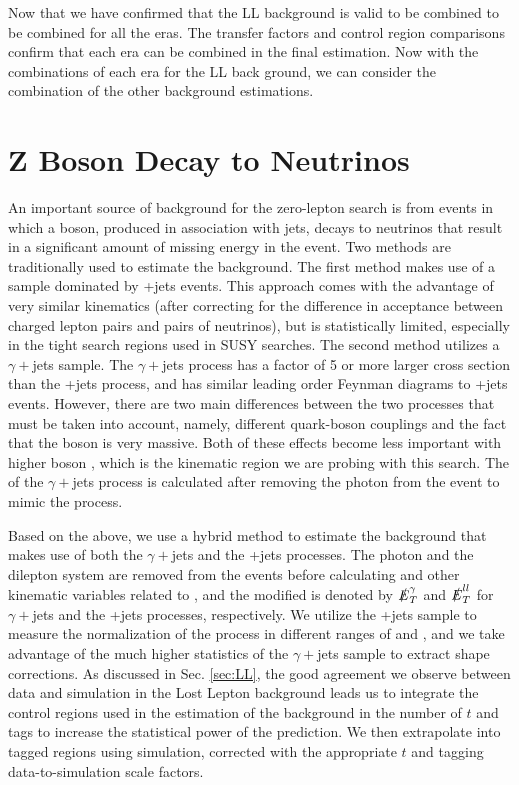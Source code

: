 Now that we have confirmed that the LL background is valid to be combined to be combined for all the eras. The transfer factors and control region comparisons confirm that each era can be combined in the final estimation. Now with the combinations of each era for the LL back ground, we can consider the combination of the other background estimations. 

\section{Z Boson Decay to Neutrinos}
\label{subsec:Znunu}

An important source of background for the zero-lepton search is from events in which a \Z{} boson, produced in association with jets, decays to neutrinos that result in a significant amount of missing energy in the event. Two methods are traditionally used to estimate the \Znunu{} background. The first method makes use of a sample dominated by \Zll+jets events. This approach comes with the advantage of very similar kinematics (after correcting for the difference in acceptance between charged lepton pairs and pairs of neutrinos), but is statistically limited, especially in the tight search regions used in SUSY searches. The second method utilizes a $\gamma+$jets sample. The $\gamma+$jets process has a factor of 5 or more larger cross section than the \Zll+jets process, and has similar leading order Feynman diagrams to \Z+jets events. However, there are two main differences between the two processes that must be taken into account, namely, different quark-boson couplings and the fact that the \Z{} boson is very massive. Both of these effects become less important with higher boson \pt, which is the kinematic region we are probing with this search. The \met{} of the $\gamma+$jets process is calculated after removing the photon from the event to mimic the \Znunu{} process.

Based on the above, we use a hybrid method to estimate the \Znunu{} background that makes use of both the $\gamma+$jets and the \Zll+jets processes. The photon and the dilepton system are removed from the events before calculating \met{} and other kinematic variables related to \met, and the modified \met{} is denoted by $\slashed{E}_{T}^\gamma$ and $\slashed{E}_{T}^{ll}$ for $\gamma+$jets and the \Zll+jets processes, respectively. We utilize the \Zll+jets sample to measure the normalization of the \Znunu{} process in different ranges of \nb{} and \nsv, and we take advantage of the much higher statistics of the $\gamma+$jets sample to extract shape corrections. As discussed in Sec. \ref{sec:LL}, the good agreement we observe between data and simulation in the Lost Lepton background leads us to integrate the control regions used in the estimation of the \Znunu{} background in the number of $t$ and \W{} tags to increase the statistical power of the prediction. We then extrapolate into tagged regions using simulation, corrected with the appropriate $t$ and \W{} tagging data-to-simulation scale factors.

